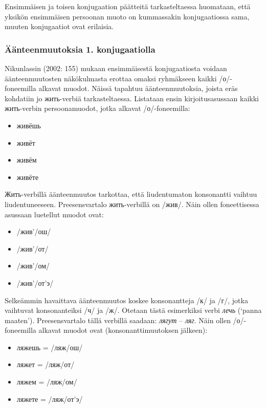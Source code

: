 \documentclass[]{scrartcl}
\providecommand{\tightlist}{%
  \setlength{\itemsep}{0pt}\setlength{\parskip}{0pt}}
\begin{document}
Ensimmäisen ja toisen konjugaation päätteitä tarkasteltaessa huomataan,
että yksikön ensimmäisen persoonan muoto on kummassakin konjugaatiossa
sama, muuten konjugaatiot ovat erilaisia.

\subsubsection{Äänteenmuutoksia 1.
konjugaatiolla}\label{uxe4uxe4nteenmuutoksia-1.-konjugaatiolla}

Nikunlassin (2002: 155) mukaan ensimmäisestä konjugaatiosta voidaan
äänteenmuutosten näkökulmasta erottaa omaksi ryhmäkseen kaikki
/о/-foneemilla alkavat muodot. Näissä tapahtuu äänteenmuutoksia, joista
eräs kohdatiin jo жить-verbiä tarkasteltaessa. Listataan ensin
kirjoitusasussaan kaikki жить-verbin persoonamuodot, jotka alkavat
/о/-foneemilla:

\begin{itemize}
\tightlist
\item
  живёшь
\item
  живёт
\item
  живём
\item
  живёте
\end{itemize}

Жить-verbillä äänteenmuutos tarkottaa, että liudentumaton konsonantti
vaihtuu liudentuneeseen. Preesensvartalo жить-verbillä on /жив/. Näin
ollen foneettisessa asussaan luetellut muodot ovat:

\begin{itemize}
\tightlist
\item
  /жив'/ош/
\item
  /жив'/от/
\item
  /жив'/ом/
\item
  /жив'/от'э/
\end{itemize}

Selkeämmin havaittava äänteenmuutos koskee konsonantteja /к/ ja /г/,
jotka vaihtuvat konsonanteiksi /ч/ ja /ж/. Otetaan tästä esimerkiksi
verbi \emph{лечь} (`panna maaten'). Preesensvartalo tällä verbillä
saadaan: \emph{лягут} -- \emph{ляг}. Näin ollen /о/-foneemilla alkavat
muodot ovat (konsonanttimuutoksen jälkeen):

\begin{itemize}
\tightlist
\item
  ляжешь = /ляж/ош/
\item
  ляжет = /ляж/от/
\item
  ляжем = /ляж/ом/
\item
  ляжете = /ляж/от'э/
\end{itemize}
\end{document}
